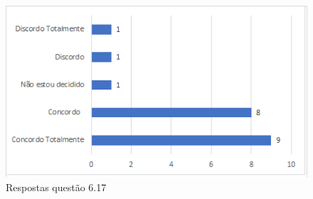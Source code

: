 \begin{figure}[t]
\centering
\includegraphics[scale=0.7]{figuras das questoes/6.17.png}
\caption{Respostas questão 6.17}
\end{figure}

\begin{itemize}
\end{itemize}


 

 

 
